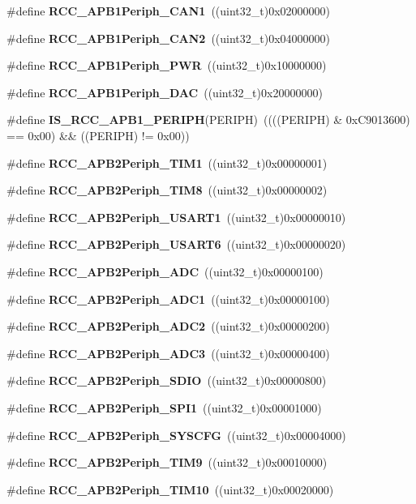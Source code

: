 \begin{DoxyCompactItemize}
\item 
\#define \textbf{ R\+C\+C\+\_\+\+A\+P\+B1\+Periph\+\_\+\+C\+A\+N1}~((uint32\+\_\+t)0x02000000)
\item 
\#define \textbf{ R\+C\+C\+\_\+\+A\+P\+B1\+Periph\+\_\+\+C\+A\+N2}~((uint32\+\_\+t)0x04000000)
\item 
\#define \textbf{ R\+C\+C\+\_\+\+A\+P\+B1\+Periph\+\_\+\+P\+WR}~((uint32\+\_\+t)0x10000000)
\item 
\#define \textbf{ R\+C\+C\+\_\+\+A\+P\+B1\+Periph\+\_\+\+D\+AC}~((uint32\+\_\+t)0x20000000)
\item 
\#define \textbf{ I\+S\+\_\+\+R\+C\+C\+\_\+\+A\+P\+B1\+\_\+\+P\+E\+R\+I\+PH}(P\+E\+R\+I\+PH)~((((P\+E\+R\+I\+PH) \& 0x\+C9013600) == 0x00) \&\& ((\+P\+E\+R\+I\+P\+H) != 0x00))
\item 
\#define \textbf{ R\+C\+C\+\_\+\+A\+P\+B2\+Periph\+\_\+\+T\+I\+M1}~((uint32\+\_\+t)0x00000001)
\item 
\#define \textbf{ R\+C\+C\+\_\+\+A\+P\+B2\+Periph\+\_\+\+T\+I\+M8}~((uint32\+\_\+t)0x00000002)
\item 
\#define \textbf{ R\+C\+C\+\_\+\+A\+P\+B2\+Periph\+\_\+\+U\+S\+A\+R\+T1}~((uint32\+\_\+t)0x00000010)
\item 
\#define \textbf{ R\+C\+C\+\_\+\+A\+P\+B2\+Periph\+\_\+\+U\+S\+A\+R\+T6}~((uint32\+\_\+t)0x00000020)
\item 
\#define \textbf{ R\+C\+C\+\_\+\+A\+P\+B2\+Periph\+\_\+\+A\+DC}~((uint32\+\_\+t)0x00000100)
\item 
\#define \textbf{ R\+C\+C\+\_\+\+A\+P\+B2\+Periph\+\_\+\+A\+D\+C1}~((uint32\+\_\+t)0x00000100)
\item 
\#define \textbf{ R\+C\+C\+\_\+\+A\+P\+B2\+Periph\+\_\+\+A\+D\+C2}~((uint32\+\_\+t)0x00000200)
\item 
\#define \textbf{ R\+C\+C\+\_\+\+A\+P\+B2\+Periph\+\_\+\+A\+D\+C3}~((uint32\+\_\+t)0x00000400)
\item 
\#define \textbf{ R\+C\+C\+\_\+\+A\+P\+B2\+Periph\+\_\+\+S\+D\+IO}~((uint32\+\_\+t)0x00000800)
\item 
\#define \textbf{ R\+C\+C\+\_\+\+A\+P\+B2\+Periph\+\_\+\+S\+P\+I1}~((uint32\+\_\+t)0x00001000)
\item 
\#define \textbf{ R\+C\+C\+\_\+\+A\+P\+B2\+Periph\+\_\+\+S\+Y\+S\+C\+FG}~((uint32\+\_\+t)0x00004000)
\item 
\#define \textbf{ R\+C\+C\+\_\+\+A\+P\+B2\+Periph\+\_\+\+T\+I\+M9}~((uint32\+\_\+t)0x00010000)
\item 
\#define \textbf{ R\+C\+C\+\_\+\+A\+P\+B2\+Periph\+\_\+\+T\+I\+M10}~((uint32\+\_\+t)0x00020000)

\end{DoxyCompactItemize}
